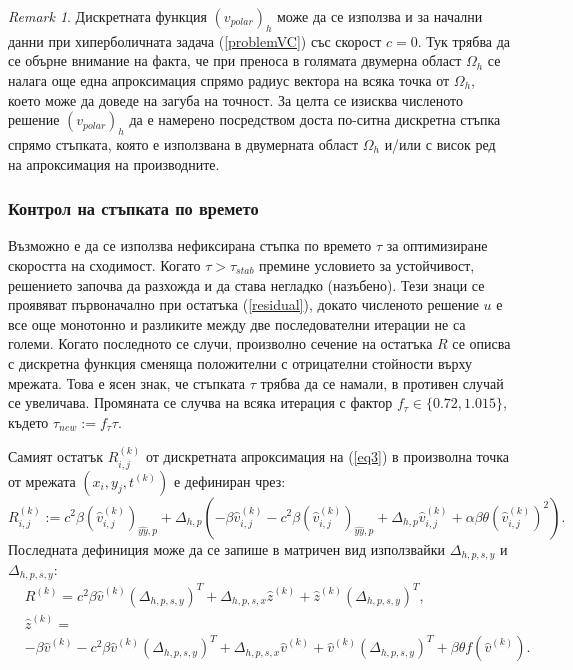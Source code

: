 \documentclass{article}
\newcommand{\rf}[1]{(\ref{#1})}
\theoremstyle{remark}
\newtheorem*{remark}{Remark}
\begin{document}
\begin{remark}
Дискретната функция $(v_{polar})_h$ може да се използва и за начални данни при хиперболичната задача \rf{problemVC} със скорост $c=0$. Тук трябва да се обърне внимание на факта, че при преноса в голямата двумерна област $\Omega_h$ се налага още една апроксимация спрямо радиус вектора на всяка точка от $\Omega_h$, което може да доведе на загуба на точност. За целта се изисква численото решение $(v_{polar})_h$ да е намерено посредством доста по-ситна дискретна стъпка спрямо стъпката, която е използвана в двумерната област $\Omega_h$ и/или с висок ред на апроксимация на производните.
\end{remark}

\subsubsection{Контрол на стъпката по времето}
Възможно е да се използва нефиксирана стъпка по времето $\tau$ за оптимизиране скоростта на сходимост. Когато $\tau > \tau_{stab}$ премине условието за устойчивост, решението започва да разхожда и да става негладко (назъбено). Тези знаци се проявяват първоначално при остатъка \rf{residual}, докато численото решение $u$ е все още монотонно и разликите между две последователни итерации не са големи. Когато последното се случи, произволно сечение на остатъка $R$ се описва с дискретна функция сменяща положителни с отрицателни стойности върху мрежата. Това е ясен знак, че стъпката $\tau$ трябва да се намали, в противен случай се увеличава. Промяната се случва на всяка итерация с фактор $f_{\tau} \in \{0.72, 1.015\}$, където $\tau_{new} := f_{\tau}\tau$.

Самият остатък $R^{(k)}_{i,j}$ от дискретната апроксимация на \rf{eq3} в произволна точка от мрежата $(x_i,y_j,t^{(k)})$ е дефиниран чрез:
\begin{equation}\label{residual}
R_{i,j}^{(k)} := 
c^2\beta (\widehat{v}^{(k)}_{i,j})_{\widehat{yy},p} + \Delta_{h,p}(-\beta \widehat{v}^{(k)}_{i,j} - c^2\beta (\widehat{v}^{(k)}_{i,j})_{\widehat{yy},p} + \Delta_{h,p} \widehat{v}^{(k)}_{i,j} 
+ \alpha \beta \theta (\widehat{v}^{(k)}_{i,j})^2  ).
\end{equation}
Последната дефиниция може да се запише в матричен вид използвайки $\Delta_{h,p,s,y}$ и $\Delta_{h,p,s,y}$:
\begin{align}\label{residualM}
&R^{(k)} = 
c^2\beta \widehat{v}^{(k)}(\Delta_{h,p,s,y})^T + \Delta_{h,p,s,x}  \widehat{z}^{(k)} + \widehat{z}^{(k)}  (\Delta_{h,p,s,y} )^T, \nonumber\\
&\widehat{z}^{(k)}  = \nonumber\\
&-\beta \widehat{v}^{(k)} - c^2\beta \widehat{v}^{(k)}(\Delta_{h,p,s,y})^T + \Delta_{h,p,s,x}  \widehat{v}^{(k)} +  \widehat{v}^{(k)}  (\Delta_{h,p,s,y})^T 
+ \beta \theta f(\widehat{v}^{(k)}).
\end{align}
 
\end{document}
